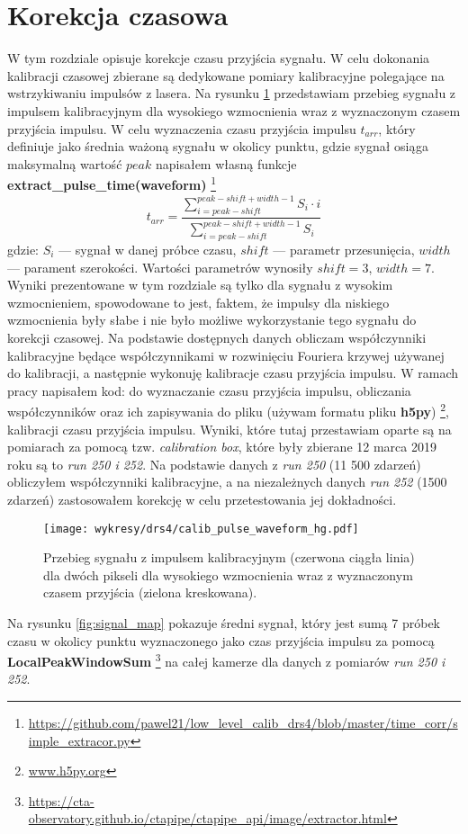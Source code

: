 \documentclass[a4paper,11pt,twoside]{article}
\begin{document}
\section{Korekcja czasowa}
W tym rozdziale opisuje korekcje czasu przyjścia sygnału. 
W celu dokonania kalibracji czasowej zbierane są dedykowane pomiary kalibracyjne polegające na wstrzykiwaniu impulsów z lasera. Na rysunku \ref{fig:calib_waveform_hg} przedstawiam przebieg sygnału z impulsem kalibracyjnym dla wysokiego wzmocnienia wraz z wyznaczonym czasem przyjścia impulsu.
W celu wyznaczenia czasu przyjścia impulsu $t_{arr}$, który definiuje jako średnia ważoną sygnału w okolicy punktu, gdzie sygnał osiąga maksymalną wartość $peak$ napisałem własną funkcje {\bf{extract\_pulse\_time(waveform)}} \footnote{ \url{https://github.com/pawel21/low_level_calib_drs4/blob/master/time_corr/simple_extracor.py}}
\begin{equation}
t_{arr} = \frac{ \sum_{i=peak - shift}^{peak - shift + width - 1} S_i \cdot i }{ \sum_{i=peak - shift}^{peak - shift + width -1} S_i}
\label{egn:time}
\end{equation} 
gdzie: $S_i$ --- sygnał w danej próbce czasu, $shift$ --- parametr przesunięcia, $width$ --- parament szerokości. Wartości parametrów wynosiły $shift = 3$, $width = 7$. \\

 Wyniki prezentowane w tym rozdziale są tylko dla sygnału z wysokim wzmocnieniem, spowodowane to jest, faktem, że impulsy dla niskiego wzmocnienia były słabe i nie było możliwe wykorzystanie tego sygnału do korekcji czasowej.  Na podstawie dostępnych danych obliczam współczynniki kalibracyjne będące współczynnikami w rozwinięciu Fouriera krzywej używanej do kalibracji, a następnie wykonuję kalibracje czasu przyjścia impulsu. W ramach pracy napisałem kod: do wyznaczanie czasu przyjścia impulsu, obliczania współczynników oraz ich zapisywania do pliku (używam formatu pliku {\bf{h5py}}) \footnote{\url{www.h5py.org}}, kalibracji czasu przyjścia impulsu. Wyniki, które tutaj przestawiam oparte są na pomiarach za pomocą tzw. \textsl{calibration box}, które były zbierane 12 marca 2019 roku są to \textsl{run 250 i 252}. Na podstawie danych z \textsl{run 250} (11 500 zdarzeń) obliczyłem współczynniki kalibracyjne, a na niezależnych danych \textsl{run 252} (1500 zdarzeń) zastosowałem korekcję w celu przetestowania jej dokładności. 
\begin{figure}[H] 
\centering
\texttt{[image: wykresy/drs4/calib\_pulse\_waveform\_hg.pdf]}
\caption{Przebieg sygnału z impulsem kalibracyjnym (czerwona ciągła linia) dla dwóch pikseli dla wysokiego wzmocnienia wraz z wyznaczonym czasem przyjścia (zielona kreskowana).}
\label{fig:calib_waveform_hg}
\end{figure}
Na rysunku \ref{fig:signal_map} pokazuje średni sygnał, który jest sumą 7 próbek czasu w okolicy punktu wyznaczonego jako czas przyjścia impulsu za pomocą {\bf{LocalPeakWindowSum}} \footnote{\url{https://cta-observatory.github.io/ctapipe/ctapipe_api/image/extractor.html}} na całej kamerze dla danych z pomiarów \textsl{run 250 i 252}. 
\end{document}
